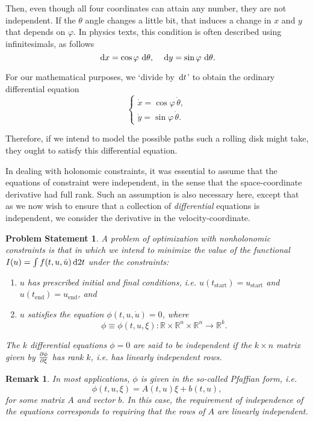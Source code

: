 \documentclass{article}
\theoremstyle{plain}
\theoremstyle{plain}
\newtheorem{remark}{Remark}
\theoremstyle{nonumberplain}
\newtheorem{statement}{Problem Statement}
\theoremstyle{empty}
\newcommand{\R}{\mathbb{R}}
\newcommand{\tstart}{\mathrm{start}}
\newcommand{\tend}{\mathrm{end}}
\begin{document}
Then, even though all four coordinates can attain any number, they are not independent. If the $\theta$ angle changes a little bit, that induces a change in $x$ and $y$ that depends on $\varphi$. In physics texts, this condition is often described using infinitesimals, as follows
\[\dl x = \cos \varphi \, \dl \theta, \quad \dl y = \sin \varphi \, \dl \theta.\]

For our mathematical purposes, we `divide by $\dl t$' to obtain the ordinary differential equation
\[
\begin{cases}
\dot x = \cos \varphi \, \dot \theta,\\
\dot y = \sin \varphi \, \dot \theta.
\end{cases}
\]

Therefore, if we intend to model the possible paths such a rolling disk might take, they ought to satisfy this differential equation.

In dealing with holonomic constraints, it was essential to assume that the equations of constraint were independent, in the sense that the space-coordinate derivative had full rank. Such an assumption is also necessary here, except that  as we now wish to ensure that a collection of \emph{differential} equations is independent, we consider the derivative in the velocity-coordinate.

\begin{statement}
A problem of optimization with nonholonomic constraints is that in which we intend to minimize the value of the functional $I(u) = \int f(t, u, \dot u) \dl2 t$ under the constraints:
\begin{enumerate}
\item $u$ has prescribed initial and final conditions, i.e. $u(t_\tstart) = u_\tstart$ and $u(t_\tend) = u_\tend$, and
\item $u$ satisfies the equation $\phi(t,u,\dot u) = 0$, where
\[\phi \equiv \phi(t, u, \xi) \colon \R \times \R^n \times \R^n \to \R^k.\]
\end{enumerate}

The $k$ differential equations $\phi = 0$ are said to be \emph{independent} if the $k \times n$ matrix given by $\diffp \phi \xi$ has rank $k$, i.e. has linearly independent rows.
\end{statement}

\begin{remark}\label{pfaffian}
In most applications, $\phi$ is given in the so-called Pfaffian form, i.e.
\[\phi(t,u,\xi) = A(t,u) \xi + b(t,u),\]
for some matrix $A$ and vector $b$. In this case, the requirement of independence of the equations corresponds to requiring that the rows of $A$ are linearly independent.
\end{remark}
\end{document}
